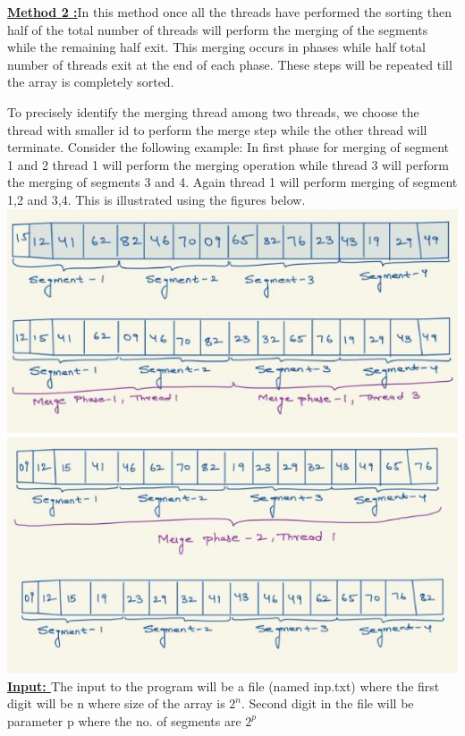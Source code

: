 \documentclass{article}
\begin{document}
\noindent\textbf{\underline {Method 2 :}}In this method once all the threads have performed the sorting then half of the total number of threads will perform the merging of the segments while the remaining half exit. This merging occurs in phases while half total number of threads exit at the end of each phase. These steps will be repeated till the array is completely sorted. 

To precisely identify the merging thread among two threads, we choose the thread with smaller id to perform the merge step while the other thread will terminate. Consider the following example: In first phase for merging of segment 1 and 2 thread 1 will perform the merging operation while thread 3 will perform the merging of segments 3 and 4. Again thread 1 will perform merging of segment 1,2 and 3,4. This is illustrated using the figures below. \\ 



\includegraphics[width=\textwidth]{M-2,IMg1.JPG}
\includegraphics[width=\textwidth]{M-2,img2.JPG}\\
\noindent\textbf{\underline {Input: }}The input to the program will be a file (named inp.txt) where the first digit will be n where size of the array is $2^n$. Second digit in the file will be parameter p where the no. of segments are $2^p$
\\
\end{document}
